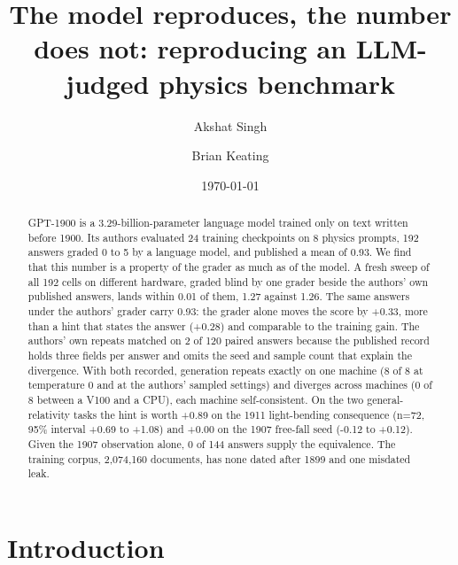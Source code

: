 \documentclass[reprint,prx,amsmath,amssymb,aps,superscriptaddress]{revtex4-2}
\begin{document}
\title{The model reproduces, the number does not: reproducing an LLM-judged physics benchmark}
\author{Akshat Singh}
\author{Brian Keating}
\date{\today}

\begin{abstract}
GPT-1900 is a 3.29-billion-parameter language model trained only on text written before 1900. Its authors evaluated 24 training checkpoints on 8 physics prompts, 192 answers graded 0 to 5 by a language model, and published a mean of 0.93. We find that this number is a property of the grader as much as of the model. A fresh sweep of all 192 cells on different hardware, graded blind by one grader beside the authors' own published answers, lands within 0.01 of them, 1.27 against 1.26. The same answers under the authors' grader carry 0.93: the grader alone moves the score by +0.33, more than a hint that states the answer (+0.28) and comparable to the training gain. The authors' own repeats matched on 2 of 120 paired answers because the published record holds three fields per answer and omits the seed and sample count that explain the divergence. With both recorded, generation repeats exactly on one machine (8 of 8 at temperature 0 and at the authors' sampled settings) and diverges across machines (0 of 8 between a V100 and a CPU), each machine self-consistent. On the two general-relativity tasks the hint is worth +0.89 on the 1911 light-bending consequence (n=72, 95\% interval +0.69 to +1.08) and +0.00 on the 1907 free-fall seed (-0.12 to +0.12). Given the 1907 observation alone, 0 of 144 answers supply the equivalence. The training corpus, 2,074,160 documents, has none dated after 1899 and one misdated leak.

\end{abstract}

\maketitle

\section{Introduction}
\end{document}
